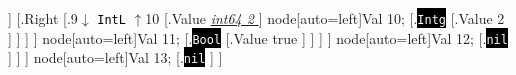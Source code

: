 \documentclass[border=0.2cm]{standalone}
\begin{document}
                    ]
                    [.{\small Right}
                        [.{9$\downarrow$ \colorbox{bluish}{\textcolor{black}{\tt IntL}} $\uparrow$10}
                            [.{\small Value}
                            \underline{\it int64 2 }
                            ]
                            \edge node[auto=left]{\tiny Val 10};                              [.{\colorbox{black}{\textcolor{white}{\tt Intg}}}
                            [.{\small Value}
                            2
                            ]
                            ]
                        ]
                    ]
                    \edge node[auto=left]{\tiny Val 11};                      [.{\colorbox{black}{\textcolor{white}{\tt Bool}}}
                    [.{\small Value}
                    true
                    ]
                    ]
                ]
            ]
            \edge node[auto=left]{\tiny Val 12};              [.{\colorbox{black}{\textcolor{white}{\tt nil}}}             ]
        ]
    ]
    \edge node[auto=left]{\tiny Val 13};      [.{\colorbox{black}{\textcolor{white}{\tt nil}}}     ]
]
\end{document}
